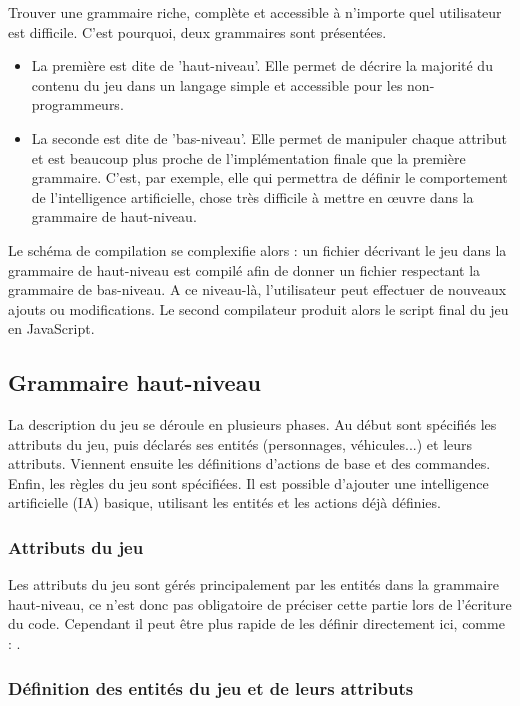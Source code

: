 Trouver une grammaire riche, complète et accessible à n'importe quel utilisateur est difficile.
C'est pourquoi, deux grammaires sont présentées.
\begin{itemize}
 \item La première est dite de 'haut-niveau'.
Elle permet de décrire la majorité du contenu du jeu dans un langage simple et accessible pour les non-programmeurs.
 \item La seconde est dite de 'bas-niveau'.
Elle permet de manipuler chaque attribut et est beaucoup plus proche de l'implémentation finale que la première grammaire.
C'est, par exemple, elle qui permettra de définir le comportement de l'intelligence artificielle, chose très difficile à mettre en œuvre dans la grammaire de haut-niveau.
\end{itemize}

Le schéma de compilation se complexifie alors : un fichier décrivant le jeu dans la grammaire de haut-niveau est compilé afin de donner un fichier
respectant la grammaire de bas-niveau. A ce niveau-là, l'utilisateur peut effectuer de nouveaux ajouts ou modifications. Le second compilateur
produit alors le script final du jeu en JavaScript.

\subsection{Grammaire haut-niveau}

La description du jeu se déroule en plusieurs phases.
Au début sont spécifiés les attributs du jeu, puis déclarés ses entités (personnages, véhicules...) et leurs attributs. 
Viennent ensuite les définitions d'actions de base et des commandes.
Enfin, les règles du jeu sont spécifiées.
Il est possible d'ajouter une intelligence artificielle (IA) basique, utilisant les entités et les actions déjà définies.

\subsubsection{Attributs du jeu}

Les attributs du jeu sont gérés principalement par les entités dans la grammaire haut-niveau, ce n'est donc pas obligatoire 
de préciser cette partie lors de l'écriture du code. Cependant il peut être plus rapide de les définir directement ici, comme :
.

\subsubsection{Définition des entités du jeu et de leurs attributs}

